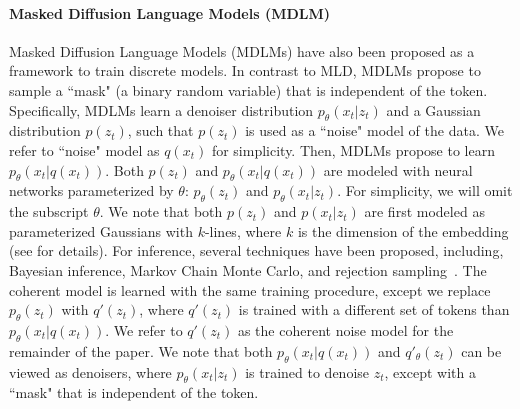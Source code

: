 \paragraph{Masked Diffusion Language Models (MDLM)}
Masked Diffusion Language Models (MDLMs) have also been proposed as a framework to train discrete models. In contrast to MLD, MDLMs propose to sample a ``mask" (a binary random variable) that is independent of the token. Specifically, MDLMs learn a denoiser distribution $p_\theta(x_t|z_t)$ and a Gaussian distribution $p(z_t)$, such that $p(z_t)$ is used as a ``noise" model of the data. We refer to ``noise" model as $q(x_t)$ for simplicity. Then, MDLMs propose to learn $p_\theta(x_t|q(x_t))$. Both $p(z_t)$ and $p_\theta(x_t|q(x_t))$ are modeled with neural networks parameterized by $\theta$: $p_\theta(z_t)$ and $p_\theta(x_t| z_t)$. For simplicity, we will omit the subscript $\theta$. We note that both $p(z_t)$ and $p(x_t|z_t)$ are first modeled as parameterized Gaussians with $k$-lines, where $k$ is the dimension of the embedding (see \citet{austin2023structured,shih2022training} for details). For inference, several techniques have been proposed, including, Bayesian inference, Markov Chain Monte Carlo, and rejection sampling~\citep{austin2023structured,shih2022training}. 
The coherent model is learned with the same training procedure, except we replace $p_\theta(z_t)$ with $q'(z_t)$, where $q'(z_t)$ is trained with a different set of tokens than $p_\theta(x_t|q(x_t))$. We refer to $q'(z_t)$ as the coherent noise model for the remainder of the paper. We note that both $p_\theta(x_t|q(x_t))$ and $q'_\theta(z_t)$ can be viewed as denoisers, where $p_\theta(x_t|z_t)$ is trained to denoise $z_t$, except with a ``mask" that is independent of the token. 

